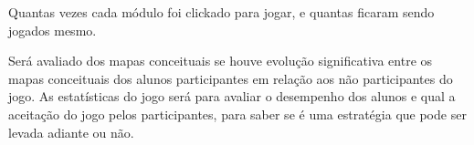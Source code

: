 Quantas vezes cada módulo foi clickado para jogar, e quantas ficaram sendo jogados mesmo.

Será avaliado dos mapas conceituais se houve evolução significativa entre os mapas conceituais dos alunos participantes em relação aos não participantes do jogo.
As estatísticas do jogo será para avaliar o desempenho dos alunos e qual a aceitação do jogo pelos participantes, para saber se é uma estratégia que pode ser levada adiante ou não.